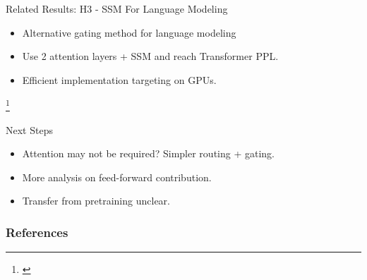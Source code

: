 \documentclass[14pt,aspectratio=169]{beamer}
\newcommand\blfootnote[1]{%
\begingroup
\renewcommand\thefootnote{}\footnote{#1}%
\addtocounter{footnote}{-1}%
\endgroup
}
\begin{document}
\begin{frame}{Related Results: H3 - SSM For Language Modeling}
\begin{itemize}
    \item Alternative gating method for language modeling
    \item Use 2 attention layers + SSM and reach Transformer PPL. 
    \item Efficient implementation targeting on GPUs. 
\end{itemize}

    \blfootnote{\cite{dao2022hungry}}
\end{frame}




\begin{frame}{Next Steps}
\begin{itemize}
    \item Attention may not be required? Simpler routing + gating. 
    \item More analysis on feed-forward contribution. 
    \item Transfer from pretraining unclear.
\end{itemize}
\end{frame}



% 
% 
% 
% 
% 
% 
% 
\begin{frame}[allowframebreaks]
        \frametitle{References}
        \footnotesize
        
        
\end{frame}
\end{document}
